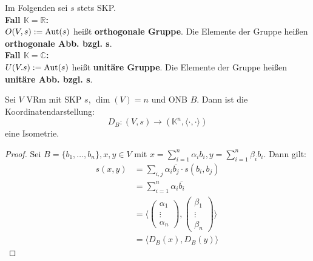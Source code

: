 \documentclass[parskip,a4paper,twoside,DIV15,BCOR12mm]{scrbook}
\begin{document}
\begin{definition}
Im Folgenden sei $s$ stets SKP.\\
\textbf{Fall $\mathbb{K}=\mathbb{R}$:}\\
$O(V,s):=\operatorname{Aut}(s)$ heißt \textbf{orthogonale Gruppe}. Die Elemente der Gruppe
heißen \textbf{orthogonale Abb. bzgl. s}.\\
\textbf{Fall $\mathbb{K}=\mathbb{C}$:}\\
$U(V.s):=\operatorname{Aut}(s)$ heißt \textbf{unitäre Gruppe}. Die Elemente der Gruppe heißen
\textbf{unitäre Abb. bzgl. s}.
\end{definition}

\begin{comment}
Eine wichtige Isometrie ist: abstrakter VRm $\cong$ Standartraum
\end{comment}

\begin{theo}
Sei $V$ VRm mit SKP $s$, $\dim(V)=n$ und ONB $B$. Dann ist die Koordinatendarstellung:\\
\[D_B:(V,s)\to(\mathbb{K}^n,\langle\cdot,\cdot\rangle)\] eine Isometrie.
\end{theo}

\begin{proof}
Sei $B=\{b_1,\ldots,b_n\}, x,y\in V$ mit $x=\sum_{i=1}^n{\alpha_i b_i},
y=\sum_{i=1}^n{\beta_i b_i}$. Dann gilt:
\begin{align*}
s(x,y)&=\sum_{i,j}{\alpha_i \overline{b_j}\cdot s(b_i,b_j)}\\
&= \sum_{i=1}^n{\alpha_i \overline{b_i}}\\
&= \langle
\begin{pmatrix}
\alpha_1\\
\vdots\\
\alpha_n
\end{pmatrix},
\begin{pmatrix}
\beta_1\\
\vdots\\
\beta_n
\end{pmatrix} 
\rangle\\
&= \langle D_B(x),D_B(y)\rangle
\end{align*}
\end{proof}

\begin{comment}
\begin{enumerate}
\index{Längentreue}\index{Winkeltreue}
\item Sei $\Phi: V_1\to V_2$ Morphismus von SKP-Räumen, dann ist $\Phi$ \textbf{längentreu}.
\[\iff\|x\|_1 = \|\Phi(x)\|_2\]
\textbf{Winkeltreue} für $K=\mathbb{R}$ bedeutet: 
\[\frac{\langle x_1,y_1\rangle_1}{\|x_1\|_1\|y_1\|_1} = \frac{\langle\Phi(x_1),
\Phi(y_1)\rangle_2}{\|\Phi(x_1)\|_2\|\Phi(y_1)\|_2}\]
\item $\Phi:(V,s)\to(V,s)$ Endomorphismus von SKP-Räumen und $\dim(V)<\infty
\implies \Phi$ ist Isomorphismus und Automorphismus, also orthogonal und unitär. 
\end{enumerate}
\end{comment}
\end{document}
